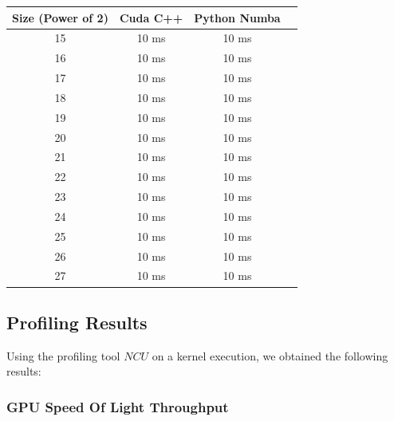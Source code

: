 \documentclass[a4paper, 12pt, oneside]{article}
\begin{document}
\begin{center}
  \begin{tabular}{ |c|c|c|c| }
    \hline
    \textbf{Size (Power of 2)} & \textbf{Cuda C++} & \textbf{Python Numba} \\
    \hline
    15                         & 10 ms             & 10 ms                 \\
    16                         & 10 ms             & 10 ms                 \\
    17                         & 10 ms             & 10 ms                 \\
    18                         & 10 ms             & 10 ms                 \\
    19                         & 10 ms             & 10 ms                 \\
    20                         & 10 ms             & 10 ms                 \\
    21                         & 10 ms             & 10 ms                 \\
    22                         & 10 ms             & 10 ms                 \\
    23                         & 10 ms             & 10 ms                 \\
    24                         & 10 ms             & 10 ms                 \\
    25                         & 10 ms             & 10 ms                 \\
    26                         & 10 ms             & 10 ms                 \\
    27                         & 10 ms             & 10 ms                 \\
    \hline
  \end{tabular}
\end{center}

\subsection{Profiling Results}

Using the profiling tool $NCU$ on a kernel execution, we obtained the following results:\\

\subsubsection{GPU Speed Of Light Throughput}
\end{document}
